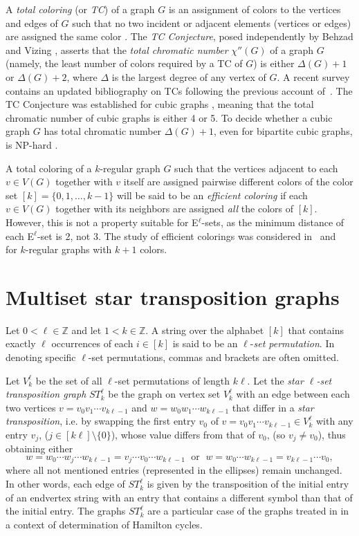 \documentclass[12pt,reqno]{article}
\begin{document}
A {\it total coloring} (or {\it TC}) of a graph $G$ is an assignment of colors to the vertices and edges of $G$ such that no two incident or adjacent elements (vertices or edges)
are assigned the same color \cite{tc-as}.
The {\it TC Conjecture}, posed independently by Behzad \cite{B1,B2} and Vizing \cite{V},  asserts that the {\it total chromatic number} $\chi''(G)$ of a graph $G$ (namely, the least number of colors required by a TC of $G$) is either $\Delta(G)+1$ or $\Delta(G)+2$, where $\Delta$ is the largest degree of any vertex of $G$. A recent survey \cite{tc-as} contains an updated bibliography on TCs following the previous account of~\cite{Yap}.   
 The TC Conjecture was established for cubic graphs \cite{Feng,Mazzu,Rosen,Vi}, meaning that the total chromatic number of cubic graphs is either 4 or 5. To decide whether a cubic graph $G$ has total chromatic number $\Delta(G)+1$, even for bipartite cubic graphs, is NP-hard \cite{Arroyo}.

A total coloring of a $k$-regular graph $G$ such that the vertices adjacent to each $v\in V(G)$ together with $v$ itself are assigned pairwise different colors of the color set $[k]=\{0,1,\ldots,k-1\}$ will be said to be an {\it efficient coloring} if each $v\in V(G)$ together with its neighbors are assigned {\it all} the colors of $[k]$. 
However, this is not a property suitable for E$^\ell$-sets, as the minimum distance of each E$^\ell$-set is 2, not 3.
The study of efficient colorings was considered in~\cite{prev} and~\cite{cong} for $k$-regular graphs with $k+1$ colors.

\section{Multiset star transposition graphs}\label{s2}

Let $0<\ell\in\mathbb{Z}$ and let $1<k\in\mathbb{Z}$. A string over the alphabet $[k]$ that contains exactly $\ell$ occurrences of each $i\in[k]$ is said to be an $\ell$-{\it set permutation}.
In denoting specific $\ell$-set permutations, commas and brackets are often omitted. 

Let $V^\ell_k$ be the set of all $\ell$-set permutations of length $k\ell$. Let the {\it star $\ell$-set transposition graph} $ST^\ell_k$ be the graph on vertex set $V^\ell_k$ with an edge between each two vertices $v=v_0v_1\cdots v_{k\ell-1}$ and $w=w_0w_1\cdots w_{k\ell-1}$ that differ in a {\it star transposition}, i.e. by swapping the first entry $v_0$ of $v=v_0v_1\cdots v_{k\ell-1}\in V^\ell_k$ with any entry $v_j$, ($j\in[k\ell]\setminus\{0\}$), whose value differs from that of  $v_0$, (so $v_j\ne v_0$), thus obtaining either $$w=w_0\cdots w_j\cdots w_{k\ell-1}=v_j\cdots v_0\cdots w_{k\ell-1}\;\mbox{ or }\;w=w_0\cdots w_{k\ell-1}=v_{k\ell-1}\cdots v_0,$$
where all not mentioned entries (represented in the ellipses) remain unchanged.  In other words,
each edge of $ST^\ell_k$ is given by the transposition of the initial entry of an endvertex string with an entry that contains a different symbol than that of the initial entry. The graphs $ST_k^\ell$ are a particular case of the graphs treated in \cite{faltaba} in a context of determination of Hamilton cycles.
\end{document}
